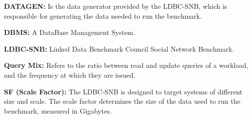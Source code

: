 

%
%
%
%
%
%
%
%
%
%


{\flushleft \textbf{DATAGEN:}} Is the data generator provided by the LDBC-SNB, which
is responsible for generating the data needed to run the benchmark.

{\flushleft \textbf{DBMS:}} A DataBase Management System. 

{\flushleft \textbf{LDBC-SNB:}} Linked Data Benchmark Council Social Network Benchmark. 

{\flushleft \textbf{Query Mix:}} Refers to the ratio between read and update queries
of a workload, and the frequency at which they are issued.

{\flushleft \textbf{SF (Scale Factor):}} The LDBC-SNB is designed to target systems of
different size and scale. The scale factor determines the size of the data used
to run the benchmark, measured in Gigabytes.


